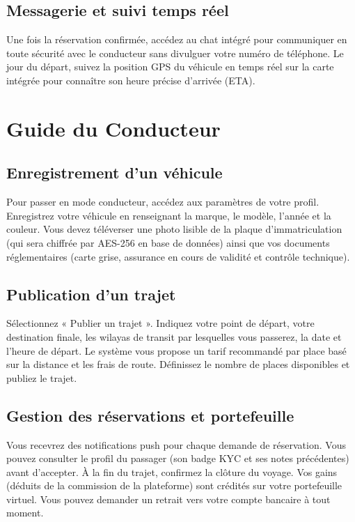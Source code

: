 \subsection{Messagerie et suivi temps réel}
Une fois la réservation confirmée, accédez au chat intégré pour communiquer en toute sécurité avec le conducteur sans divulguer votre numéro de téléphone. Le jour du départ, suivez la position GPS du véhicule en temps réel sur la carte intégrée pour connaître son heure précise d'arrivée (ETA).

\section{Guide du Conducteur}
\label{sec:guide-conducteur}

\subsection{Enregistrement d'un véhicule}
Pour passer en mode conducteur, accédez aux paramètres de votre profil. Enregistrez votre véhicule en renseignant la marque, le modèle, l'année et la couleur. Vous devez téléverser une photo lisible de la plaque d'immatriculation (qui sera chiffrée par AES-256 en base de données) ainsi que vos documents réglementaires (carte grise, assurance en cours de validité et contrôle technique).

\subsection{Publication d'un trajet}
Sélectionnez « Publier un trajet ». Indiquez votre point de départ, votre destination finale, les wilayas de transit par lesquelles vous passerez, la date et l'heure de départ. Le système vous propose un tarif recommandé par place basé sur la distance et les frais de route. Définissez le nombre de places disponibles et publiez le trajet.

\subsection{Gestion des réservations et portefeuille}
Vous recevrez des notifications push pour chaque demande de réservation. Vous pouvez consulter le profil du passager (son badge KYC et ses notes précédentes) avant d'accepter. À la fin du trajet, confirmez la clôture du voyage. Vos gains (déduits de la commission de la plateforme) sont crédités sur votre portefeuille virtuel. Vous pouvez demander un retrait vers votre compte bancaire à tout moment.

